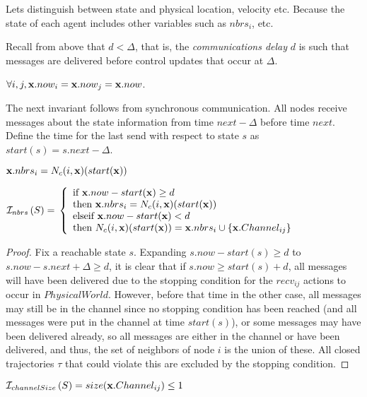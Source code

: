 \documentclass[10pt, conference, compsocconf]{IEEEtran}
\begin{document}
Lets distinguish between state and physical location, velocity etc. Because the state of each agent includes other variables such as $nbrs_i$, etc.

Recall from above that $d < \Delta$, that is, the \textit{communications delay} $d$ is such that messages are delivered before control updates that occur at $\Delta$.

\begin{inv}
\label{inv:now}
$\forall i, j, {\bf x}.now_i = {\bf x}.now_j = {\bf x}.now$.
\end{inv}

The next invariant follows from synchronous communication.
All nodes receive messages about the state information from time $next - \Delta$ before time $next$.
Define the time for the last send with respect to state $s$ as $start(s) = s.next - \Delta$.
\begin{inv}
\label{inv:send}

${\bf x}.nbrs_i = N_c(i, {\bf x})(start({\bf x}))$

${\cal I}_{nbrs}\left(S\right) = \\
	\left\{
		\begin{array}{l}
			\textrm{if } {\bf x}.now - start({\bf x}) \geq d \\ \textrm{then } {\bf x}.nbrs_i = N_c(i, {\bf x})(start({\bf x}))\\
			\textrm{elseif } {\bf x}.now - start({\bf x}) < d \\ \textrm{then } N_c(i, {\bf x})(start({\bf x})) = {\bf x}.nbrs_i \cup \{{\bf x}.Channel_{ij}\}\\
		\end{array}
	\right.$
\end{inv}
\begin{proof}
Fix a reachable state $s$.  Expanding $s.now - start(s) \geq d$ to $s.now - s.next + \Delta \geq d$, it is clear that if $s.now \geq start(s) + d$, all messages will have been delivered due to the stopping condition for the $recv_{ij}$ actions to occur in $PhysicalWorld$.  However, before that time in the other case, all messages may still be in the channel since no stopping condition has been reached (and all messages were put in the channel at time $start(s)$), or some messages may have been delivered already, so all messages are either in the channel or have been delivered, and thus, the set of neighbors of node $i$ is the union of these.  All closed trajectories $\tau$ that could violate this are excluded by the stopping condition.
\end{proof}

\begin{inv}

${\cal I}_{channelSize}\left(S\right) = size({\bf x}.Channel_{ij}) \leq 1$

\end{inv}
\end{document}
